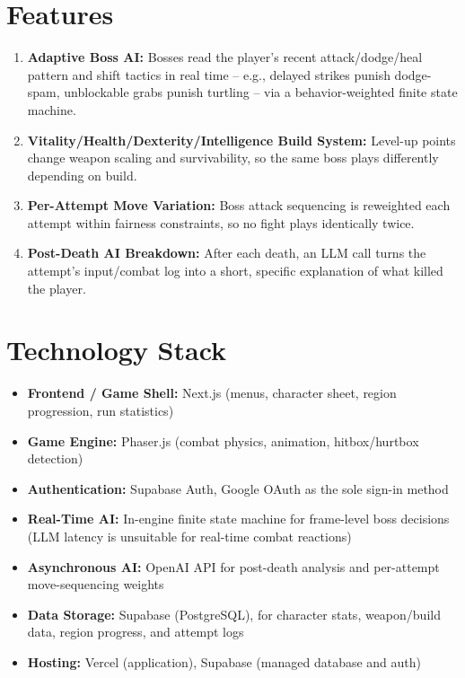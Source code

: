\documentclass[conference]{IEEEtran}
\begin{document}
\section{Features}
\begin{enumerate}
\item \textbf{Adaptive Boss AI:} Bosses read the player's recent attack/dodge/heal pattern and shift tactics in real time -- e.g., delayed strikes punish dodge-spam, unblockable grabs punish turtling -- via a behavior-weighted finite state machine.
\item \textbf{Vitality/Health/Dexterity/Intelligence Build System:} Level-up points change weapon scaling and survivability, so the same boss plays differently depending on build.
\item \textbf{Per-Attempt Move Variation:} Boss attack sequencing is reweighted each attempt within fairness constraints, so no fight plays identically twice.
\item \textbf{Post-Death AI Breakdown:} After each death, an LLM call turns the attempt's input/combat log into a short, specific explanation of what killed the player.
\end{enumerate}

\section{Technology Stack}
\begin{itemize}
\item \textbf{Frontend / Game Shell:} Next.js (menus, character sheet, region progression, run statistics)
\item \textbf{Game Engine:} Phaser.js (combat physics, animation, hitbox/hurtbox detection)
\item \textbf{Authentication:} Supabase Auth, Google OAuth as the sole sign-in method
\item \textbf{Real-Time AI:} In-engine finite state machine for frame-level boss decisions (LLM latency is unsuitable for real-time combat reactions)
\item \textbf{Asynchronous AI:} OpenAI API for post-death analysis and per-attempt move-sequencing weights
\item \textbf{Data Storage:} Supabase (PostgreSQL), for character stats, weapon/build data, region progress, and attempt logs
\item \textbf{Hosting:} Vercel (application), Supabase (managed database and auth)
\end{itemize}
\end{document}
